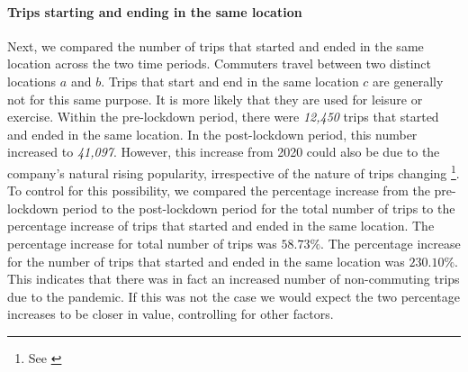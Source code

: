 \documentclass[11pt,a4paper]{article}
\begin{document}
\paragraph{Trips starting and ending in the same location} Next, we compared the number of trips that started and ended in the same location across the two time periods. Commuters travel between two distinct locations $a$ and $b$. Trips that start and end in the same location $c$ are generally not for this same purpose. It is more likely that they are used for leisure or exercise. Within the pre-lockdown period, there were \emph{12,450} trips that started and ended in the same location. In the post-lockdown period, this number increased to \emph{41,097}. However, this increase from 2020 could also be due to the company's natural rising popularity, irrespective of the nature of trips changing \footnote{See \emph{}}. To control for this possibility, we compared the percentage increase from the pre-lockdown period to the post-lockdown period for the total number of trips to the percentage increase of trips that started and ended in the same location. The percentage increase for total number of trips was $58.73\%$. The percentage increase for the number of trips that started and ended in the same location was $230.10\%$. This indicates that there was in fact an increased number of non-commuting trips due to the pandemic. If this was not the case we would expect the two percentage increases to be closer in value, controlling for other factors. 
\end{document}
